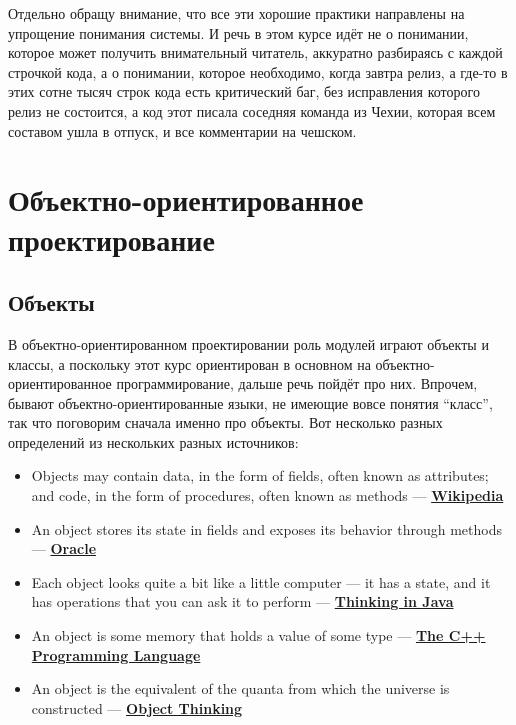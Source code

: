 \documentclass{../../text-style}
\begin{document}
Отдельно обращу внимание, что все эти хорошие практики направлены на упрощение понимания системы. И речь в этом курсе идёт не о понимании, которое может получить внимательный читатель, аккуратно разбираясь с каждой строчкой кода, а о понимании, которое необходимо, когда завтра релиз, а где-то в этих сотне тысяч строк кода есть критический баг, без исправления которого релиз не состоится, а код этот писала соседняя команда из Чехии, которая всем составом ушла в отпуск, и все комментарии на чешском.

\section{Объектно-ориентированное проектирование}

\subsection{Объекты}

В объектно-ориентированном проектировании роль модулей играют объекты и классы, а поскольку этот курс ориентирован в основном на объектно-ориентированное программирование, дальше речь пойдёт про них. Впрочем, бывают объектно-ориентированные языки, не имеющие вовсе понятия ``класс'', так что поговорим сначала именно про объекты. Вот несколько разных определений из нескольких разных источников:

\begin{itemize}
	\item Objects may contain data, in the form of fields, often known as attributes; and code, in the form of procedures, often known as methods --- \textbf{\href{https://en.wikipedia.org/wiki/Object-oriented\_programming}{Wikipedia}}
	\item An object stores its state in fields and exposes its behavior through methods --- \textbf{\href{https://docs.oracle.com/javase/tutorial/java/concepts/object.html}{Oracle}}
	\item Each object looks quite a bit like a little computer --- it has a state, and it has operations that you can ask it to perform --- \textbf{\href{http://amzn.to/1PBmQpm}{Thinking in Java}}
	\item An object is some memory that holds a value of some type --- \textbf{\href{http://amzn.to/1XyGCtk}{The C++ Programming Language}}
	\item An object is the equivalent of the quanta from which the universe is constructed --- \textbf{\href{http://amzn.to/266oJr4}{Object Thinking}}
\end{itemize}
\end{document}
